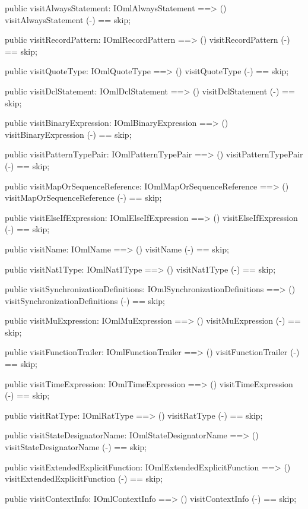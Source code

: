 \begin{vdm_al}
  public visitAlwaysStatement: IOmlAlwaysStatement ==> ()
  visitAlwaysStatement (-) == skip;

  public visitRecordPattern: IOmlRecordPattern ==> ()
  visitRecordPattern (-) == skip;

  public visitQuoteType: IOmlQuoteType ==> ()
  visitQuoteType (-) == skip;

  public visitDclStatement: IOmlDclStatement ==> ()
  visitDclStatement (-) == skip;

  public visitBinaryExpression: IOmlBinaryExpression ==> ()
  visitBinaryExpression (-) == skip;

  public visitPatternTypePair: IOmlPatternTypePair ==> ()
  visitPatternTypePair (-) == skip;

  public visitMapOrSequenceReference: IOmlMapOrSequenceReference ==> ()
  visitMapOrSequenceReference (-) == skip;

  public visitElseIfExpression: IOmlElseIfExpression ==> ()
  visitElseIfExpression (-) == skip;

  public visitName: IOmlName ==> ()
  visitName (-) == skip;

  public visitNat1Type: IOmlNat1Type ==> ()
  visitNat1Type (-) == skip;

  public visitSynchronizationDefinitions: IOmlSynchronizationDefinitions ==> ()
  visitSynchronizationDefinitions (-) == skip;

  public visitMuExpression: IOmlMuExpression ==> ()
  visitMuExpression (-) == skip;

  public visitFunctionTrailer: IOmlFunctionTrailer ==> ()
  visitFunctionTrailer (-) == skip;

  public visitTimeExpression: IOmlTimeExpression ==> ()
  visitTimeExpression (-) == skip;

  public visitRatType: IOmlRatType ==> ()
  visitRatType (-) == skip;

  public visitStateDesignatorName: IOmlStateDesignatorName ==> ()
  visitStateDesignatorName (-) == skip;

  public visitExtendedExplicitFunction: IOmlExtendedExplicitFunction ==> ()
  visitExtendedExplicitFunction (-) == skip;

  public visitContextInfo: IOmlContextInfo ==> ()
  visitContextInfo (-) == skip;


\end{vdm_al}
